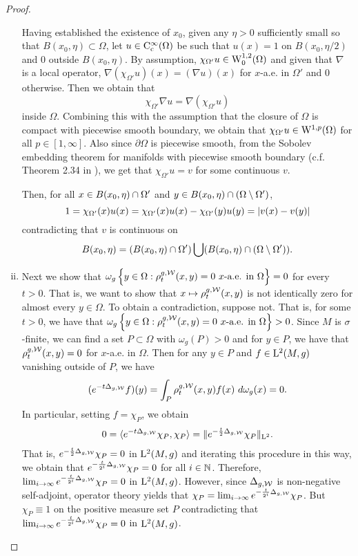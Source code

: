 \documentclass[a4paper, 12pt]{amsart}
\begin{document}
\begin{proof}
\begin{enumerate}[(i)]
	Having established the existence of $x_0$, given any $\eta > 0$ sufficiently small so that $B(x_0,\eta) \subset \Omega$, let $u \in \Ck[c]{\infty}(\Omega)$ be such that $u(x) = 1$ on $B(x_0, \eta/2)$ and $0$ outside $B(x_0,\eta)$. By assumption, $\chi_{\Omega'} u \in \SobH[0]{1}(\Omega)$ and  given that $\nabla$ is a local operator, $\nabla (\chi_{\Omega'} u)(x) = (\nabla u)(x)$ for $x$-a.e. in $\Omega'$ and $0$ otherwise. Then we obtain that
	$$\chi_{\Omega'}\nabla u = \nabla(\chi_{\Omega'} u)$$
	inside $\Omega$.
	Combining this with the assumption that the  closure of $\Omega$ is compact with piecewise smooth boundary, we obtain that $\chi_{\Omega'} u \in \Sob{1,p}(\Omega)$ for all $p \in [1,\infty]$. 
	Also since $\partial \Omega$ is piecewise smooth, from the Sobolev embedding theorem for manifolds with piecewise smooth boundary (c.f. Theorem 2.34 in \cite{Aubin}), we get that $\chi_{\Omega'} u = v$ for some continuous $v$.

	
	Then, for all $x \in B(x_0,\eta) \intersect \Omega'$ and $y \in B(x_0,\eta) \intersect (\Omega \setminus \Omega')$, 
	$$1 = \chi_{\Omega'}(x)u(x) = \chi_{\Omega'}(x) u(x) - \chi_{\Omega'}(y)u(y) = \modulus{v(x) - v(y)}$$ 
	contradicting that $v$ is continuous on
        $$B(x_0, \eta) = (B(x_0,\eta) \intersect \Omega') \bigcup (B(x_0,\eta) \intersect (\Omega \setminus \Omega')).$$


\item Next we show that $\omega_g\set{y \in \Omega: \hk^{g,\cW}_{t}(x,y) = 0\ \text{$x$-a.e. in}\ \Omega} = 0$ for every $t>0$. 
	That is, we want to show that $x \mapsto \hk^{g,\cW}_{t}(x,y)$ is not identically zero for almost every $y \in \Omega$.
	To obtain a contradiction, suppose not.
	That is, for some $t > 0$, we have that $\omega_g\set{y \in \Omega: \hk^{g,\cW}_{t}(x,y) = 0\ \text{$x$-a.e. in}\ \Omega} > 0$.
	Since $M$ is $\sigma$-finite, we can find a set $P \subset \Omega$ with $\omega_g(P) > 0$ and for $y \in P$, we have that $\hk^{g,\cW}_t(x,y) = 0$ for $x$-a.e. in $\Omega$. 
	Then for any $y \in P$ and $f \in \Lp{2}(M, g)$ vanishing outside of $P$, we have
	$$ (e^{-t\Delta_{g,\cW}} f)(y) = \int_{P} \hk_t^{g,\cW}(x,y) f(x)\ d\omega_g(x) = 0.$$
	In particular, setting $f = \chi_{P}$, we obtain
	$$ 0 = \inprod{e^{-t\Delta_{g,\cW}} \chi_{P}, \chi_{P}} = \norm{  e^{-\frac{t}{2}\Delta_{g,\cW}} \chi_{P}}_{\Lp{2}}.$$ 
	That is, $e^{-\frac{t}{2}\Delta_{g,\cW}} \chi_P = 0$ in $\Lp{2}(M, g)$ and iterating this procedure in this way, we obtain that
	$ e^{-\frac{t}{2^i}\Delta_{g,\cW}}\chi_P = 0$ for all $i \in \Na$.
	Therefore, $\lim_{i \to \infty} e^{-\frac{t}{2^i}\Delta_{g,\cW}} \chi_P = 0$ in $\Lp{2}(M, g)$.
	However, since $\Delta_{g,\cW}$ is non-negative self-adjoint, operator theory yields that $\chi_P = \lim_{i \to \infty} e^{-\frac{t}{2^i}\Delta_{g,\cW}}\chi_P$.
        But \(\chi_P \equiv 1\) on the positive measure set $P$ contradicting that $\lim_{i \to \infty} e^{-\frac{t}{2^i}\Delta_{g,\cW}}\chi_P = 0$ in $\Lp{2}(M, g)$.
	

\end{enumerate}
\end{proof}
\end{document}
